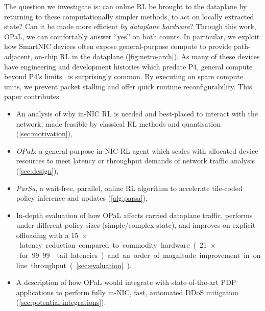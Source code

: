 \documentclass[
sigconf,natbib=false
,anonymous=true
,10pt
]{acmart}
\newcommand{\approachshort}{OPaL}
\begin{document}







The question we investigate is: can online RL be brought to the dataplane by returning to these computationally simpler methods, to act on locally extracted state?
Can it be made more efficient \emph{by dataplane hardware}?
Through this work, \approachshort{}, we can comfortably answer ``yes'' on both counts.
In particular, we exploit how SmartNIC devices often expose general-purpose compute to provide path-adjacent, on-chip RL in the dataplane (\cref{fig:netro-arch}).
As many of these devices have engineering and development histories which predate P4, general compute beyond P4's limits~\parencite{p4-psa} is surprisingly common.
By executing on spare compute units, we prevent packet stalling and offer quick runtime reconfigurability.
This paper contributes:
\begin{itemize}
	\item An analysis of why in-NIC RL is needed and best-placed to interact with the network, made feasible by classical RL methods and quantisation (\cref{sec:motivation}),
	\item \emph{\approachshort{}}: a general-purpose in-NIC RL agent which scales with allocated device resources to meet latency or throughput demands of network traffic analysis (\cref{sec:design}),
	\item \emph{ParSa}, a wait-free, parallel, online RL algorithm to accelerate tile-coded policy inference and updates (\cref{alg:parsa}),
	\item In-depth evaluation of how \approachshort{} affects carried dataplane traffic, performs under different policy sizes (simple/complex state), and improves on explicit offloading with a \SI{15}{$\times$} latency reduction compared to commodity hardware (\SI{21}{$\times$} for 99.99 tail latencies) and an order of magnitude improvement in online throughput (\cref{sec:evaluation}).
	\item A description of how \approachshort{} would integrate with state-of-the-art PDP applications to perform fully in-NIC, fast, automated DDoS mitigation (\cref{sec:potential-integrations}).
\end{itemize}
\end{document}
